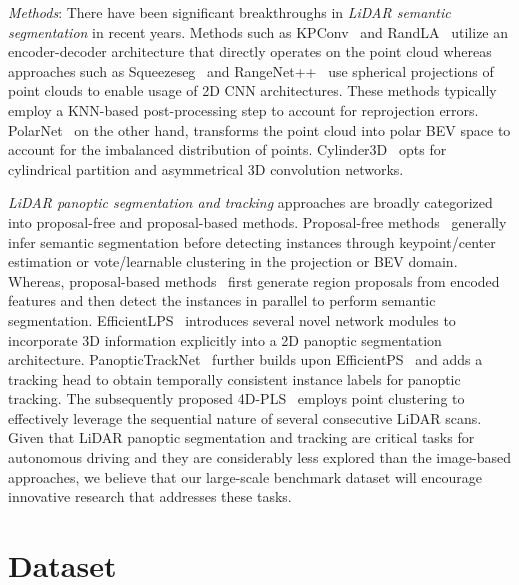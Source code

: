\documentclass[letterpaper, 10 pt, journal, twoside]{IEEEtran}
\begin{document}
\noindent\textit{Methods}: There have been significant breakthroughs in \emph{LiDAR semantic segmentation} in recent years. Methods such as KPConv~\cite{thomas2019kpconv} and RandLA~\cite{hu2020randla} utilize an encoder-decoder architecture that directly operates on the point cloud whereas approaches such as Squeezeseg~\cite{wu2018squeezeseg} and RangeNet++~\cite{milioto2019rangenet++} use spherical projections of point clouds to enable usage of 2D CNN architectures. These methods typically employ a KNN-based post-processing step to account for reprojection errors. PolarNet~\cite{zhang2020polarnet} on the other hand, transforms the point cloud into polar BEV space to account for the imbalanced distribution of points. Cylinder3D~\cite{zhu2021cylindrical} opts for cylindrical partition and asymmetrical 3D convolution networks.

\textit{LiDAR panoptic segmentation and tracking} approaches are broadly categorized into proposal-free and proposal-based methods. Proposal-free methods~\cite{milioto2020lidar, gasperini2021panoster, aygun20214d} generally infer semantic segmentation before detecting instances through keypoint/center estimation or vote/learnable clustering in the projection or BEV domain. Whereas, proposal-based methods~\cite{sirohi2021efficientlps, hurtado2020mopt} first generate region proposals from encoded features and then detect the instances in parallel to perform semantic segmentation. EfficientLPS~\cite{sirohi2021efficientlps} introduces several novel network modules to incorporate 3D information explicitly into a 2D panoptic segmentation architecture. PanopticTrackNet~\cite{hurtado2020mopt} further builds upon EfficientPS~\cite{mohan2020efficientps} and adds a tracking head to obtain temporally consistent instance labels for panoptic tracking. The subsequently proposed 4D-PLS~\cite{aygun20214d} employs point clustering to effectively leverage the sequential nature of several consecutive LiDAR scans. Given that LiDAR panoptic segmentation and tracking are critical tasks for autonomous driving and they are considerably less explored than the image-based approaches, we believe that our large-scale benchmark dataset will encourage innovative research that addresses these tasks.

 
\section{Dataset}
\label{sec:dataset}
\end{document}
